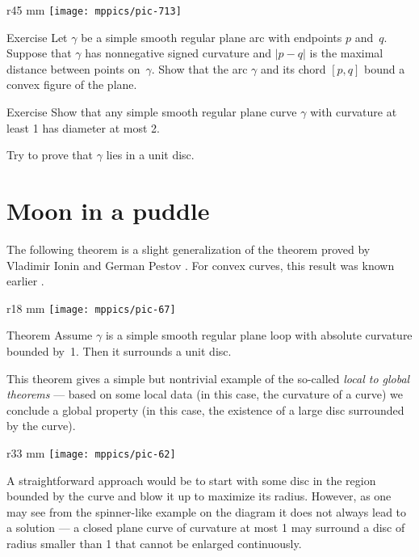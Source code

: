 \begin{wrapfigure}{r}{45 mm}
\vskip-0mm
\centering
\texttt{[image: mppics/pic-713]}
\vskip0mm
\end{wrapfigure}

\begin{thm}{Exercise}\label{ex:convex-lens}
Let $\gamma$ be a simple smooth regular plane arc with endpoints $p$ and~$q$.
Suppose that $\gamma$ has nonnegative signed curvature and $|p-q|$ is the maximal distance between points on~$\gamma$.
Show that the arc $\gamma$ and its chord $[p,q]$ bound a convex figure of the plane.
\end{thm}

\begin{thm}{Exercise}\label{ex:diameter-of-simple-curve}
Show that any simple smooth regular plane curve $\gamma$ with curvature at least 1 has diameter at most 2.

Try to prove that $\gamma$ lies in a unit disc.
\end{thm}


\section{Moon in a puddle}

The following theorem is a slight generalization of the theorem proved by Vladimir Ionin and German Pestov \cite{ionin-pestov}.
For convex curves, this result was known earlier \cite[\S 24]{blaschke}.


\begin{wrapfigure}{r}{18 mm}
\vskip-6mm
\centering
\texttt{[image: mppics/pic-67]}
\vskip0mm
\end{wrapfigure}

\begin{thm}{Theorem}\label{thm:moon-orginal}
Assume $\gamma$ is a simple smooth regular plane loop with absolute curvature bounded by~1.
Then it surrounds a unit disc.
\end{thm}

This theorem gives a simple but nontrivial example of the so-called \emph{local to global theorems} --- based on some local data (in this case, the curvature of a curve) we conclude a global property (in this case, the existence of a large disc surrounded by the curve).

{

\begin{wrapfigure}{r}{33 mm}
\vskip-4mm
\centering
\texttt{[image: mppics/pic-62]}
\vskip0mm
\end{wrapfigure}

A straightforward approach would be to start with some disc in the region bounded by the curve and blow it up to maximize its radius.
However, as one may see from the spinner-like example on the diagram it does not always lead to a solution --- a closed plane curve of curvature at most 1 may surround a disc of radius smaller than 1 that cannot be enlarged continuously.

}

